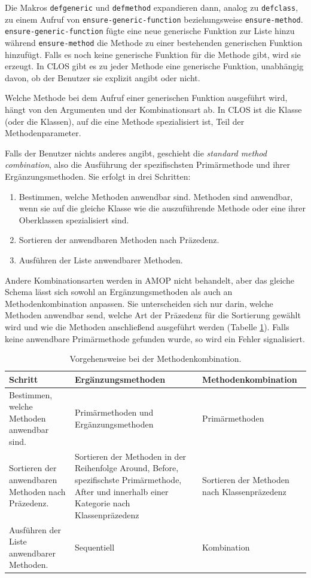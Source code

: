 Die Makros \texttt{defgeneric} und \texttt{defmethod} expandieren dann, analog zu \texttt{defclass}, zu einem Aufruf von \texttt{ensure-generic-function} beziehungsweise \texttt{ensure-method}. \texttt{ensure-generic-function} fügte eine neue generische Funktion zur Liste hinzu während \texttt{ensure-method} die Methode zu einer bestehenden generischen Funktion hinzufügt. Falls es noch keine generische Funktion für die Methode gibt, wird sie erzeugt. In CLOS gibt es zu jeder Methode eine generische Funktion, unabhängig davon, ob der Benutzer sie explizit angibt oder nicht.

Welche Methode bei dem Aufruf einer generischen Funktion ausgeführt wird, hängt von den Argumenten und der Kombinationsart ab. In CLOS ist die Klasse (oder die Klassen), auf die eine Methode spezialisiert ist, Teil der Methodenparameter. 

Falls der Benutzer nichts anderes angibt, geschieht die \emph{standard method combination}, also die Ausführung der spezifischsten Primärmethode und ihrer Ergänzungsmethoden. Sie erfolgt in drei Schritten:
\begin{enumerate}
 \item Bestimmen, welche Methoden anwendbar sind. Methoden sind anwendbar, wenn sie auf die gleiche Klasse wie die auszuführende Methode oder eine ihrer Oberklassen spezialisiert sind.
 \item Sortieren der anwendbaren Methoden nach Präzedenz.
 \item Ausführen der Liste anwendbarer Methoden.
\end{enumerate}

Andere Kombinationsarten werden in AMOP nicht behandelt, aber das gleiche Schema lässt sich sowohl an Ergänzungsmethoden als auch an Methodenkombination anpassen. Sie unterscheiden sich nur darin, welche Methoden anwendbar send, welche Art der Präzedenz für die Sortierung gewählt wird und wie die Methoden anschließend ausgeführt werden (Tabelle \ref{combination}). Falls keine anwendbare Primärmethode gefunden wurde, so wird ein Fehler signalisiert.

\begin{table}[h]
\begin{tabular}{|p{4.7cm}|p{4.5cm}|p{4.5cm}|}
 \hline
 \textbf{Schritt} & \textbf{Ergänzungsmethoden} & \textbf{Methodenkombination}\\\hline
 Bestimmen, welche Methoden anwendbar sind. & Primärmethoden und Ergänzungsmethoden & Primärmethoden \\\hline
 Sortieren der anwendbaren Methoden nach Präzedenz. & Sortieren der Methoden in der Reihenfolge Around, Before, spezifischste Primärmethode, After und innerhalb einer Kategorie nach Klassenpräzedenz & Sortieren der Methoden nach Klassenpräzedenz\\\hline
 Ausführen der Liste anwendbarer Methoden. & Sequentiell & Kombination\\\hline
\end{tabular}
 \caption{Vorgehensweise bei der Methodenkombination.}
 \label{combination}
\end{table}

